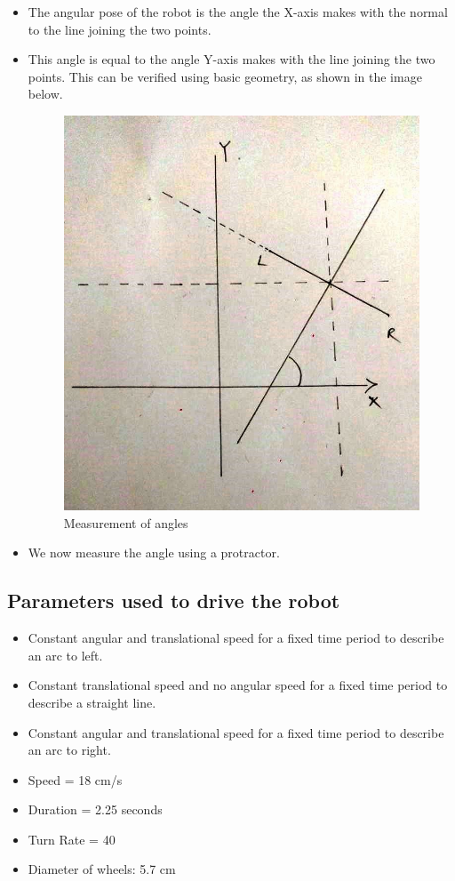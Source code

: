 \documentclass[10pt,a4paper]{article}
\begin{document}
\begin{itemize}
\begin{itemize}
								\item The angular pose of the robot is the angle the X-axis makes with the normal to the line joining the two points.
								\item This angle is equal to the angle Y-axis makes with the line joining the two points. This can be verified using basic geometry, as shown in the image below.
								\begin{figure}[h]
									\centering
									\includegraphics[width=0.4\linewidth]{img/angles.jpeg}
									\caption{Measurement of angles}
									\label{fig:angGeometry}
								\end{figure}
								\item We now measure the angle using a protractor.
							\end{itemize}
					\end{itemize}
				\subsection{Parameters used to drive the robot}
					\begin{itemize}
						\item Constant angular and translational speed for a fixed time period to describe an arc to left.
						\item Constant translational speed and no angular speed for a fixed time period to describe a straight line.
						\item Constant angular and translational speed for a fixed time period to describe an arc to right.
						\item Speed = 18 cm/s
						\item Duration = 2.25 seconds
						\item Turn Rate = 40
						\item Diameter of wheels: 5.7 cm
					\end{itemize}
\end{document}
